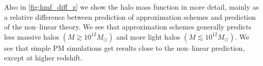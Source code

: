 Also in \autoref{fig:hmf_diff_z} we show the halo mass function in more detail, mainly as a relative difference between prediction of approximation schemes and prediction of the non--linear theory. We see that approximation schemes generally predicts less massive halos $(M\gtrsim10^{12}M_\odot)$ and more light halos $(M\lesssim10^{12}M_\odot)$. We see that simple PM simulations get results close to the non--linear prediction, except at higher redshift.
